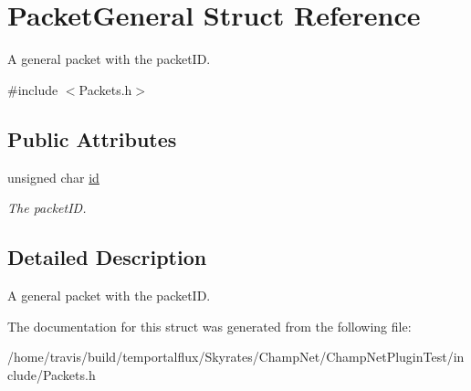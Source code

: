 \hypertarget{struct_packet_general}{\section{Packet\-General Struct Reference}
\label{struct_packet_general}
}


A general packet with the packet\-I\-D.  




{\ttfamily \#include $<$Packets.\-h$>$}

\subsection*{Public Attributes}
\begin{DoxyCompactItemize}
\item 
\hypertarget{struct_packet_general_aac5930add4956e3e3bab8c9a1d170ad8}{unsigned char \hyperlink{struct_packet_general_aac5930add4956e3e3bab8c9a1d170ad8}{id}}\label{struct_packet_general_aac5930add4956e3e3bab8c9a1d170ad8}

\begin{DoxyCompactList}\small\item\em The packet\-I\-D. \end{DoxyCompactList}\end{DoxyCompactItemize}


\subsection{Detailed Description}
A general packet with the packet\-I\-D. 

The documentation for this struct was generated from the following file\-:\begin{DoxyCompactItemize}
\item 
/home/travis/build/temportalflux/\-Skyrates/\-Champ\-Net/\-Champ\-Net\-Plugin\-Test/include/Packets.\-h\end{DoxyCompactItemize}
